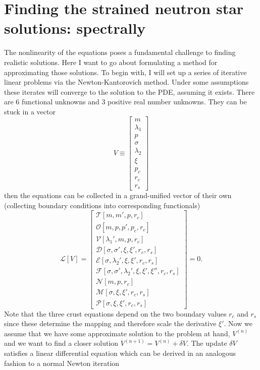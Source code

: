 \section{Finding the strained neutron star solutions: spectrally}

The nonlinearity of the equations poses a fundamental challenge to finding realistic solutions. Here I want to go about formulating a method for approximating those solutions. To begin with, I will set up a series of iterative linear problems via the Newton-Kantorovich method. Under some assumptions these iterates will converge to the solution to the PDE, assuming it exists. There are 6 functional unknowns and 3 positive real number unknowns. They can be stuck in a vector 
\begin{equation}
V \equiv \left[
\begin{array}{c}
	m \\
	\lambda_1 \\
	p \\
	\sigma \\
	\lambda_2 \\
	\xi \\
	p_c \\
	r_c \\
	r_s
\end{array}
\right]
\end{equation}
then the equations can be collected in a grand-unified vector of their own (collecting boundary conditions into corresponding functionals)
\begin{equation}
\mathcal{L}[V] = \left[
\begin{array}{l}
	\mathcal{T}[m,m',p,r_c] \\
	\mathcal{O}[m,p,p',p_c,r_c] \\
	\mathcal{V}[\lambda_1',m,p,r_c] \\
	\mathcal{D}[\sigma,\sigma',\xi,\xi',r_c,r_s] \\
	\mathcal{E}[\sigma,\lambda_2',\xi,\xi',r_c,r_s] \\
	\mathcal{F}[\sigma,\sigma',\lambda_2',\xi,\xi',\xi'',r_c,r_s] \\
	\mathcal{N}[m,p,r_c] \\
	\mathcal{M}[\sigma,\xi,\xi',r_c,r_s] \\
	\mathcal{P}[\sigma,\xi,\xi',r_c,r_s]
\end{array}
\right] = 0.
\end{equation}
Note that the three crust equations depend on the two boundary values $r_c$ and $r_s$ since these determine the mapping and therefore scale the derivative $\xi'$. Now we assume that we have some approximate solution to the problem at hand, $V^{(n)}$ and we want to find a closer solution $V^{(n+1)} = V^{(n)}+\delta V$. The update $\delta V$ satisfies a linear differential equation which can be derived in an analogous fashion to a normal Newton iteration

